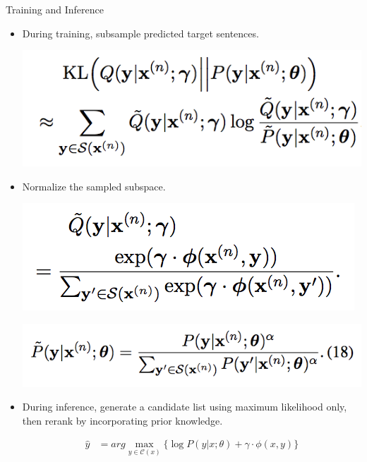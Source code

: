 \documentclass{beamer}
\begin{document}
\begin{frame}{Training and Inference}{}
\begin{itemize}
\item During training, subsample predicted target sentences.
\begin{center}\includegraphics[width=0.5\textheight]{subsample}
\end{center}

\item Normalize the sampled subspace.
\begin{center}
\begin{minipage}{.4\textwidth}
\includegraphics[width=0.5\textheight]{subsampleq}
\end{minipage}
\begin{minipage}{.4\textwidth}
\includegraphics[width=0.5\textheight]{sharpness}
\end{minipage}
\end{center}

\item During inference, generate a candidate list using maximum likelihood only, then rerank by incorporating prior knowledge.

\begin{align*}
\hat{y} &= arg\max_{y \in \mathcal{C}(x)} \{ \log P(y|x;\theta) + \gamma \cdot \phi(x, y) \}
\end{align*}

\end{itemize}

\end{frame}
\end{document}
